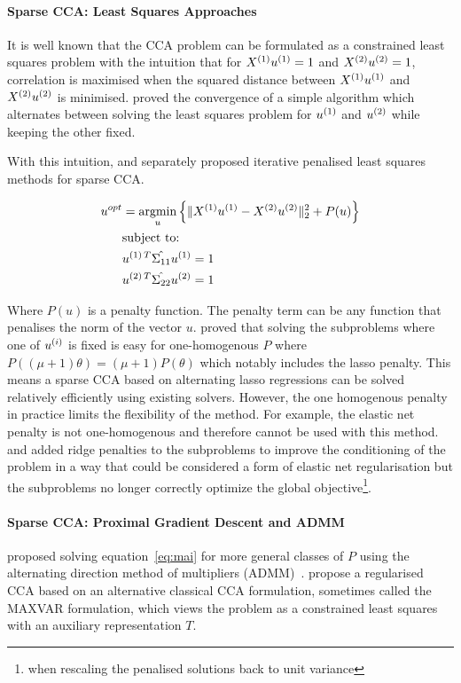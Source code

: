 \paragraph{Sparse CCA: Least Squares Approaches}

It is well known that the CCA problem can be formulated as a constrained least squares problem with the intuition that
for \(X^{(1)} u^{(1)}=1\) and \(X^{(2)} u^{(2)}=1\), correlation is maximised when the squared distance
between \(X^{(1)} u^{(1)}\) and \(X^{(2)} u^{(2)}\) is minimised. \citep{golub1995canonical} proved the
convergence of a simple algorithm which alternates between solving the least squares problem for \(u^{(1)}\) and
\(u^{(2)}\) while keeping the other fixed.

With this intuition, \cite{wilms2015sparse} and \cite{mai2019iterative} separately proposed iterative penalised least
squares methods for sparse CCA\@.

\begin{align}
    \label{eq:mai}
    u^{opt} &= \underset{u}{\mathrm{argmin}} \left\{ \|X^{(1)}u^{(1)} - X^{(2)}u^{(2)}\|_2^2 + P(u) \right\} \\
    &\text{subject to:} \notag \\
    &u^{(1)\,T} \hat{\Sigma_{11}} u^{(1)}=1 \notag \\
    &u^{(2)\,T} \hat{\Sigma_{22}} u^{(2)}=1 \notag
\end{align}

Where \(P(u)\) is a penalty function.
The penalty term can be any function that penalises the norm of the vector \(u\).
\citep{mai2019iterative} proved that solving the subproblems where one of $u^{(i)}$ is fixed is easy for one-homogenous $P$ where
\( P((\mu + 1)\theta) = (\mu + 1)P(\theta) \) which notably includes the lasso penalty.
This means a sparse CCA based
on alternating lasso regressions can be solved relatively efficiently using existing solvers.
However, the one homogenous penalty in practice limits the flexibility of the method.
For example, the elastic net penalty is not one-homogenous and therefore cannot be used with this method.
\citet{6556581} and \cite{Mullins2021} added ridge penalties to the subproblems to improve the conditioning of the problem in a way that could be considered a form of elastic net regularisation but the subproblems no longer correctly optimize the global objective\footnote{when rescaling the penalised solutions back to unit variance}.

\paragraph{Sparse CCA: Proximal Gradient Descent and ADMM}
\citet{kanatsoulis2018structured} proposed solving equation~\ref{eq:mai} for more general classes of $P$ using the alternating direction method of multipliers (ADMM)~\citep{boyd2011distributed}.
\cite{fu2017scalable} propose a regularised CCA based on an alternative classical CCA formulation, sometimes called the MAXVAR formulation, which views the problem as a constrained least squares with an auxiliary representation $T$\citep{carroll1968generalization,kettenring1971canonical}.

